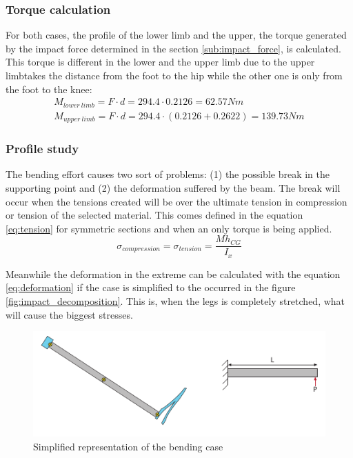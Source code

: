 \subsubsection{Torque calculation} %
\label{ssub:torque_calculation}
  For both cases, the profile of the lower limb and the upper, the torque generated by the impact force determined in the section \ref{sub:impact_force}, is calculated.
  This torque is different in the lower and the upper limb due to the upper limbtakes the distance from the foot to the hip while the other one is only from the foot to the knee:
  \begin{equation}
  \begin{aligned}
     M_{lower\ limb} = F \cdot d = 294.4 \cdot 0.2126 = 62.57 Nm\\
     M_{upper\ limb} = F \cdot d = 294.4 \cdot (0.2126 + 0.2622) = 139.73 Nm
  \end{aligned}
  \end{equation}

\subsubsection{Profile study} %
\label{ssub:profile_study}
  The bending effort causes two sort of problems: (1) the possible break in the supporting point and (2) the deformation suffered by the beam.
  The break will occur when the tensions created will be over the ultimate tension in compression or tension of the selected material.
  This comes defined in the equation \ref{eq:tension} for symmetric sections and when an only torque is being applied.
  \begin{equation}
  \label{eq:tension}
    \sigma _{compression} = \sigma _{tension} = \frac{M h_{CG}}{I_x}
  \end{equation}

  Meanwhile the deformation in the extreme can be calculated with the equation \ref{eq:deformation} if the case is simplified to the occurred in the figure \ref{fig:impact_decomposition}.
  This is, when the legs is completely stretched, what will cause the biggest stresses.

  \begin{figure}[ht!]
    \centering
    \includegraphics[width=\textwidth]{figures/bending_case.pdf}
    \caption{Simplified representation of the bending case}
    \label{fig:bending case}
  \end{figure}

